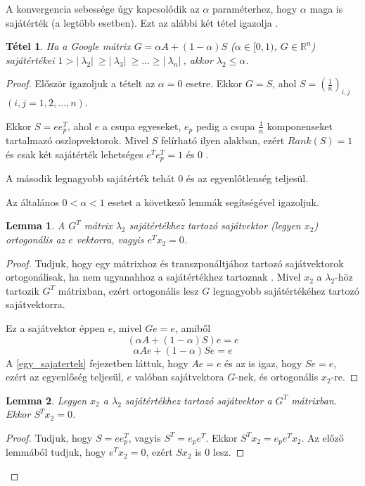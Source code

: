 \documentclass[12pt,a4paper]{article}
\newtheorem{tetel}{Tétel}
\newtheorem{lemma}{Lemma}
\begin{document}
A konvergencia sebessége úgy kapcsolódik az $\alpha$ paraméterhez, hogy $\alpha$ maga is sajátérték (a legtöbb esetben). Ezt az alábbi két tétel igazolja \cite{secondeigenvalue}. 

\vspace{0.1cm}
\begin{tetel}
		Ha a Google mátrix $G = \alpha A + (1-\alpha)S$ ($\alpha \in [0,1)$, $G \in \mathbb{R}^n$) sajátértékei $ 1 > |\ \lambda_2 |\ \geq |\ \lambda_3 |\ \geq ... \geq |\ \lambda_n |\ $, akkor $\lambda_2 \leq \alpha$.
\end{tetel}
\begin{proof}
	
	Először igazoljuk a tételt az $\alpha = 0$ esetre. Ekkor $G = S$, ahol $S = (\frac{1}{n})_{i,j}$ $(i,j = 1,2,...,n)$.
	
	Ekkor $S = e e_p^T$, ahol $e$ a csupa egyeseket, $e_p$ pedig a csupa $\frac{1}{n}$ komponenseket tartalmazó oszlopvektorok. Mivel $S$ felírható ilyen alakban, ezért $Rank(S) = 1$ és csak két sajátérték lehetséges $e^T e_p^T = 1$ és 0 \cite{rankonematrix}.   
	
	A második legnagyobb sajátérték tehát 0 és az egyenlőtlenség teljesül.
	
	\vspace{0.1cm}
	Az általános $0 < \alpha < 1$ esetet a következő lemmák segítségével igazoljuk. 
	
	\begin{lemma}\label{orthogonal_lemma}
	 	A $G^T$ mátrix $\lambda_2$ sajátértékhez tartozó sajátvektor (legyen $x_2$) ortogonális az $e$ vektorra, vagyis $e^T x_2 = 0$.
	\end{lemma}
	\begin{proof}
		Tudjuk, hogy egy mátrixhoz és transzponáltjához tartozó sajátvektorok ortogonálisak, ha nem ugyanahhoz a sajátértékhez tartoznak \cite{orthogonal_eigenvectors}. Mivel $x_2$ a $\lambda_2$-höz tartozik $G^T$ mátrixban, ezért ortogonális lesz $G$ legnagyobb sajátértékéhez tartozó sajátvektorra. 
		
		Ez a sajátvektor éppen $e$, mivel $ G e = e$, amiből
		\[  ( \alpha A + (1-\alpha) S ) e = e  \]
		\[  \alpha A e + (1-\alpha) S e = e \]
		A \ref{egy_sajatertek} fejezetben láttuk, hogy $A e = e$ és az is igaz, hogy $S e = e$, ezért az egyenlőség teljesül, $e$ valóban sajátvektora $G$-nek, és ortogonális $x_2$-re.	
		\phantom\qedhere
	\end{proof}
	
	\begin{lemma}
		Legyen $x_2$ a $\lambda_2$ sajátértékhez tartozó sajátvektor a $G^T$ mátrixban. Ekkor $S^T x_2 = 0$.
	\end{lemma}
	\begin{proof}
		Tudjuk, hogy $S = e e_p^T$, vagyis $S^T = e_p e^T$. Ekkor $S^T x_2 = e_p e^T x_2$. Az előző lemmából tudjuk, hogy $e^T x_2 = 0$, ezért $S x_2$ is 0 lesz.
		\phantom\qedhere
	\end{proof}
	

\end{proof}
\end{document}
